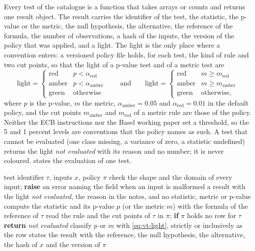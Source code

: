Every test of the catalogue is a function that takes arrays or counts and returns one result object. The result carries the identifier of the
test, the statistic, the p-value or the metric, the null hypothesis, the alternative, the reference of the formula, the number of observations,
a hash of the inputs, the version of the policy that was applied, and a light. The light is the only place where a convention enters: a versioned
policy file holds, for each test, the kind of rule and two cut points, so that the light of a p-value test and of a metric test are
\begin{equation}
  \text{light}=\begin{cases}\text{red}&p<\alpha_{\mathrm{red}}\\ \text{amber}&p<\alpha_{\mathrm{amber}}\\ \text{green}&\text{otherwise}\end{cases}
  \qquad\text{and}\qquad
  \text{light}=\begin{cases}\text{red}&m\ge m_{\mathrm{red}}\\ \text{amber}&m\ge m_{\mathrm{amber}}\\ \text{green}&\text{otherwise,}\end{cases}
  \label{eq:vt-light}
\end{equation}
where $p$ is the p-value, $m$ the metric, $\alpha_{\mathrm{amber}}=0.05$ and $\alpha_{\mathrm{red}}=0.01$ in the default policy, and the cut points $m_{\mathrm{amber}}$
and $m_{\mathrm{red}}$ of a metric rule are those of the policy. Neither the ECB instructions nor the Basel working paper set a threshold, so the
5 and 1 percent levels are conventions that the policy names as such. A test that cannot be evaluated (one class missing, a variance of zero, a
statistic undefined) returns the light \emph{not evaluated} with its reason and no number; it is never coloured.  states the
evaluation of one test.

\begin{algorithm}[htbp]
\caption{Evaluation of a registered validation test and its light.}
\label{alg:vt-test}
\begin{algorithmic}[1]
\Require test identifier $\tau$, inputs $x$, policy $\pi$
\State check the shape and the domain of every input; \textbf{raise} an error naming the field when an input is malformed
  \State \Return a result with the light \emph{not evaluated}, the reason in the notes, and no statistic, metric or p-value
\EndIf
\State compute the statistic and its p-value $p$ (or the metric $m$) with the formula of the reference of $\tau$
\State read the rule and the cut points of $\tau$ in $\pi$; \textbf{if} $\pi$ holds no row for $\tau$ \textbf{return} \emph{not evaluated}
\State classify $p$ or $m$ with \cref{eq:vt-light}, strictly or inclusively as the row states
\State \Return the result with the reference, the null hypothesis, the alternative, the hash of $x$ and the version of $\pi$
\end{algorithmic}
\end{algorithm}


